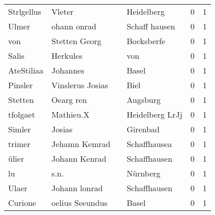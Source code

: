 \begin{center}
\begin{tiny}
\begin{longtabu}{llllrr}
               Strlgellus &                             Vleter &             &                                  Heidelberg &          0 &         1 \\
                    Ulmer &                        ohann onrad &             &                               Schaff hausen &          0 &         1 \\
                      von &                      Stetten Georg &             &                                  Bocksberfe &          0 &         1 \\
                    Salis &                           Herkules &             &                                         von &          0 &         1 \\
               AteStiliaa &                           Johannes &             &                                       Basel &          0 &         1 \\
                  Pinsler &                   Vinslerus Josias &             &                                        Biel &          0 &         1 \\
                  Stetten &                          Oearg ren &             &                                    Augsburg &          0 &         1 \\
                 tfolgaet &                          Mathieu.X &             &                             Heidelberg LrJj &          0 &         1 \\
                   Simler &                             Josias &             &                                    Girenbad &          0 &         1 \\
                   trimer &                      Jehamn Kemrad &             &                                Schaffhausea &          0 &         1 \\
                    ülier &                      Johann Kenrad &             &                                Schaffhausen &          0 &         1 \\
                       lu &                               s.n. &             &                                    Nürnberg &          0 &         1 \\
                    Ulaer &                      Johann lonrad &             &                                Schaffhausen &          0 &         1 \\
                  Curione &                    oelius Seeundus &             &                                       Basel &          0 &         1 \\

\end{longtabu}
\end{tiny}
\end{center}
